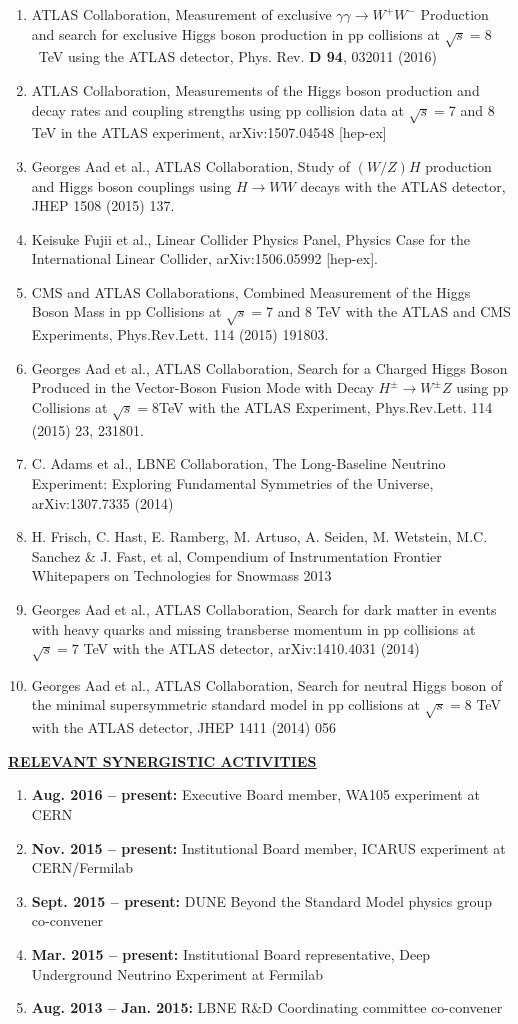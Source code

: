 \begin{enumerate}[noitemsep]
\item ATLAS Collaboration, Measurement of exclusive $\gamma\gamma\rightarrow W^{+}W^{-}$ Production and search for exclusive Higgs boson production in pp collisions at $\sqrt{s}=8$~TeV using the ATLAS detector, Phys. Rev. {\bf D 94}, 032011 (2016)
\item ATLAS Collaboration, Measurements of the Higgs boson production and decay rates and coupling strengths using pp collision data at $\sqrt{s}=$7 and 8 TeV in the ATLAS experiment, arXiv:1507.04548 [hep-ex]
\item Georges Aad et al., ATLAS Collaboration, Study of $(W/Z)H$ production and Higgs boson couplings using $H\rightarrow WW$ decays with the ATLAS detector, JHEP 1508 (2015) 137.
\item Keisuke Fujii et al., Linear Collider Physics Panel, Physics Case for the International Linear Collider, arXiv:1506.05992 [hep-ex].
\item CMS and ATLAS Collaborations, Combined Measurement of the Higgs Boson Mass in pp Collisions at $\sqrt{s}=$7 and 8 TeV with the ATLAS and CMS Experiments, Phys.Rev.Lett. 114 (2015) 191803.
\item Georges Aad et al., ATLAS Collaboration, Search for a Charged Higgs Boson Produced in the Vector-Boson Fusion Mode with Decay $H^{\pm}\rightarrow W^{\pm}Z$ using pp Collisions at $\sqrt{s}=8$TeV with the ATLAS Experiment, Phys.Rev.Lett. 114 (2015) 23, 231801.
\item C. Adams et al., LBNE Collaboration, The Long-Baseline Neutrino Experiment: Exploring Fundamental Symmetries of the Universe, arXiv:1307.7335 (2014)
\item H. Frisch, C. Hast, E. Ramberg, M. Artuso, A. Seiden, M. Wetstein, M.C. Sanchez \& J. Fast, et al, Compendium of Instrumentation Frontier Whitepapers on Technologies for Snowmass 2013
\item Georges Aad et al., ATLAS Collaboration, Search for dark matter in events with heavy quarks and missing transberse momentum in pp collisions at $\sqrt{s}=7$ TeV with the ATLAS detector, arXiv:1410.4031 (2014)
\item Georges Aad et al., ATLAS Collaboration, Search for neutral Higgs boson of the minimal supersymmetric standard model in pp collisions at $\sqrt{s}=8$ TeV with the ATLAS detector, JHEP 1411 (2014) 056
\end{enumerate}
%
{\underline{\underline{{\bf RELEVANT SYNERGISTIC ACTIVITIES}}}}
\begin{enumerate}[noitemsep]
\item {\bf Aug. 2016 -- present:} Executive Board member, WA105 experiment at CERN
\item {\bf Nov. 2015 -- present:} Institutional Board member, ICARUS experiment at CERN/Fermilab
\item {\bf Sept. 2015 -- present:} DUNE Beyond the Standard Model physics group co-convener
\item {\bf Mar. 2015 -- present:} Institutional Board representative, Deep Underground Neutrino Experiment at Fermilab
\item {\bf Aug. 2013 -- Jan. 2015:} LBNE R\&D Coordinating committee co-convener
\end{enumerate}

